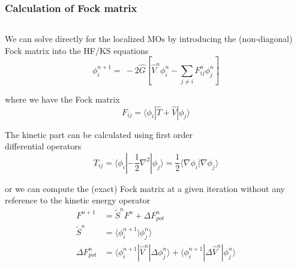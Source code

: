 \begin{frame}
    \frametitle{Calculation of Fock matrix}
    \begin{columns}
    \begin{column}[b]{0.55\textwidth}
    \centering
    We can solve directly for the localized MOs by introducing the
    (non-diagonal) Fock matrix into the HF/KS equations
    \begin{equation}
        \nonumber
        \phi_i^{n+1} =\ -2\hat{G}\left[\hat{V}^n\phi_i^n - 
            \sum_{j\neq i} F^n_{ij}\phi_j^n\right]
    \end{equation}

    \vspace{5mm}
    where we have the Fock matrix
    \begin{equation}
        \nonumber
        F_{ij} = \langle \phi_i | \hat{T} + \hat{V} | \phi_j \rangle
    \end{equation}

    \vspace{5mm}
    The kinetic part can be calculated using first order \\
    differential operators
    \begin{equation}
        \nonumber
        T_{ij} =
        \langle \phi_i | -\frac{1}{2}\nabla^2 | \phi_j \rangle = 
        \frac{1}{2}\langle \nabla \phi_i | \nabla \phi_j \rangle 
    \end{equation}

    \pause
    \vspace{5mm}
    or we can compute the (exact) Fock matrix at a given iteration without any 
    reference to the kinetic energy operator
    \begin{align}
        \nonumber
        F^{n+1} &= \tilde{S}^n F^{n} + \Delta F_{pot}^n\\
        \nonumber
        \tilde{S}^n &= \langle \phi_i^{n+1} | \phi_j^n \rangle\\
        \nonumber
        \Delta F_{pot}^n
        &= \langle \phi_i^{n+1} | \hat{V}^n | \Delta\phi_j^n \rangle
        + \langle \phi_i^{n+1} | \Delta\hat{V}^n | \phi_j^n \rangle
    \end{align}

    \end{column}


\end{columns}
\end{frame}
